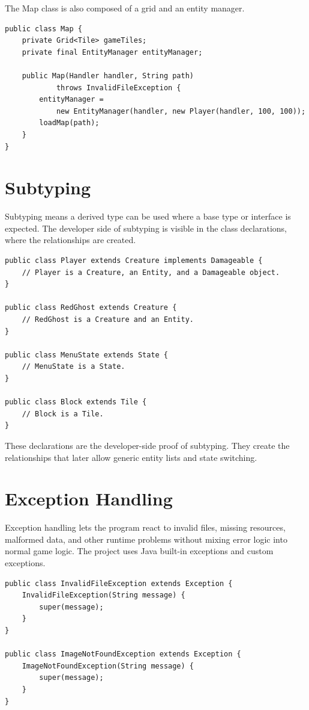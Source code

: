 \documentclass[12pt,a4paper]{article}
\begin{document}
The Map class is also composed of a grid and an entity manager.

\begin{lstlisting}
public class Map {
    private Grid<Tile> gameTiles;
    private final EntityManager entityManager;

    public Map(Handler handler, String path)
            throws InvalidFileException {
        entityManager =
            new EntityManager(handler, new Player(handler, 100, 100));
        loadMap(path);
    }
}
\end{lstlisting}


\section*{Subtyping}
Subtyping means a derived type can be used where a base type or interface is expected. The developer side of subtyping is visible in the class declarations, where the relationships are created.

\begin{lstlisting}
public class Player extends Creature implements Damageable {
    // Player is a Creature, an Entity, and a Damageable object.
}

public class RedGhost extends Creature {
    // RedGhost is a Creature and an Entity.
}

public class MenuState extends State {
    // MenuState is a State.
}

public class Block extends Tile {
    // Block is a Tile.
}
\end{lstlisting}

These declarations are the developer-side proof of subtyping. They create the relationships that later allow generic entity lists and state switching.


\section*{Exception Handling}
Exception handling lets the program react to invalid files, missing resources, malformed data, and other runtime problems without mixing error logic into normal game logic. The project uses Java built-in exceptions and custom exceptions.

\begin{lstlisting}
public class InvalidFileException extends Exception {
    InvalidFileException(String message) {
        super(message);
    }
}

public class ImageNotFoundException extends Exception {
    ImageNotFoundException(String message) {
        super(message);
    }
}
\end{lstlisting}
\end{document}
